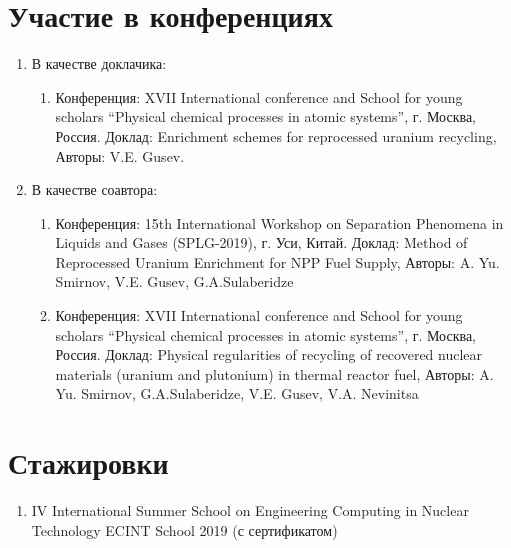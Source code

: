 \section{Участие в конференциях}
\begin{enumerate}
    \item В качестве доклачика:
    \begin{enumerate}
        \item Конференция:  XVII International conference and School for young scholars “Physical chemical processes in atomic systems”, г. Москва, Россия. Доклад: Enrichment schemes for reprocessed uranium recycling, Авторы: V.E. Gusev.
    \end{enumerate}
    \item В качестве соавтора:
    \begin{enumerate}
        \item Конференция:  15th International Workshop on Separation Phenomena in Liquids and Gases (SPLG-2019), г. Уси, Китай. Доклад: Method of Reprocessed Uranium Enrichment for NPP Fuel Supply, Авторы: A. Yu. Smirnov, V.E. Gusev, G.A.Sulaberidze
        \item Конференция:  XVII International conference and School for young scholars “Physical chemical processes in atomic systems”, г. Москва, Россия. Доклад: Physical regularities of recycling of recovered nuclear materials (uranium         and plutonium) in thermal reactor fuel, Авторы: A. Yu. Smirnov, G.A.Sulaberidze, V.E. Gusev, V.A. Nevinitsa
    \end{enumerate}
\end{enumerate}

\section{Стажировки}
    \begin{enumerate}
        \item IV International Summer School on Engineering Computing in Nuclear Technology ECINT School 2019 (с сертификатом)
    \end{enumerate}
